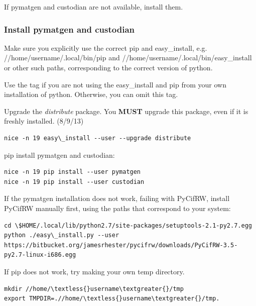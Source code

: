 \documentclass[letterpaper,10pt,english]{sphinxmanual}
\begin{document}
If pymatgen and custodian are not available, install them.


\subsubsection{Install pymatgen and custodian}
\label{1_0_installation:install-pymatgen-and-custodian}
Make sure you explicitly use the correct pip and easy\_install, e.g. //home/username/.local/bin/pip and //home/username/.local/bin/easy\_install or other such paths, corresponding to the correct version of python.

Use the  tag if you are not using the easy\_install and pip from your own installation of python. Otherwise, you can omit this tag.

Upgrade the \emph{distribute} package. You \textbf{MUST} upgrade this package, even if it is freshly installed. (8/9/13)

\begin{Verbatim}[commandchars=\\\{\}]
nice -n 19 easy\_install --user --upgrade distribute
\end{Verbatim}

pip install pymatgen and custodian:

\begin{Verbatim}[commandchars=\\\{\}]
nice -n 19 pip install --user pymatgen
nice -n 19 pip install --user custodian
\end{Verbatim}

If the pymatgen installation does not work, failing with PyCifRW, install PyCifRW manually first, using the paths that correspond to your system:

\begin{Verbatim}[commandchars=\\\{\}]
cd \$HOME/.local/lib/python2.7/site-packages/setuptools-2.1-py2.7.egg
python ./easy\_install.py --user https://bitbucket.org/jamesrhester/pycifrw/downloads/PyCifRW-3.5-py2.7-linux-i686.egg
\end{Verbatim}

If pip does not work, try making your own temp directory.

\begin{Verbatim}[commandchars=\\\{\}]
mkdir //home/\textless{}username\textgreater{}/tmp
export TMPDIR=.//home/\textless{}username\textgreater{}/tmp.
\end{Verbatim}
\end{document}
